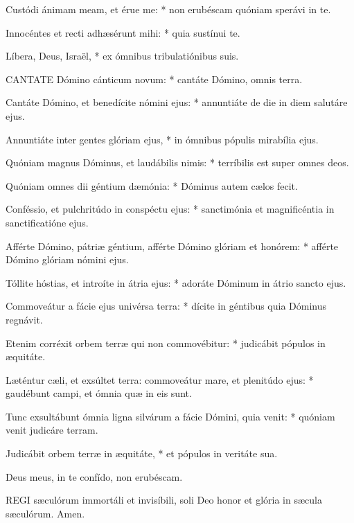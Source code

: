 Custódi ánimam meam, et érue me: * non erubéscam quóniam sperávi in te.

Innocéntes et recti adhæsérunt mihi: * quia sustínui te.

Líbera, Deus, Israël, * ex ómnibus tribulatiónibus suis.



\lettrine[lines=2]{C}{ANTATE} Dómino cánticum novum: * cantáte Dómino, omnis terra.

Cantáte Dómino, et benedícite nómini ejus: * annuntiáte de die in diem salutáre ejus.

Annuntiáte inter gentes glóriam ejus, * in ómnibus pópulis mirabília ejus.

Quóniam magnus Dóminus, et laudábilis nimis: * terríbilis est super omnes deos.

Quóniam omnes dii géntium dæmónia: * Dóminus autem cælos fecit.

Conféssio, et pulchritúdo in conspéctu ejus: * sanctimónia et magnificéntia in sanctificatióne ejus.

Afférte Dómino, pátriæ géntium, afférte Dómino glóriam et honórem: * afférte Dómino glóriam nómini ejus.

Tóllite hóstias, et introíte in átria ejus: * adoráte Dóminum in átrio sancto ejus.

Commoveátur a fácie ejus univérsa terra: * dícite in géntibus quia Dóminus regnávit.

Etenim corréxit orbem terræ qui non commovébitur: * judicábit pópulos in æquitáte.

Læténtur cæli, et exsúltet terra: commoveátur mare, et plenitúdo ejus: * gaudébunt campi, et ómnia quæ in eis sunt.

Tunc exsultábunt ómnia ligna silvárum a fácie Dómini, quia venit: * quóniam venit judicáre terram.

Judicábit orbem terræ in æquitáte, * et pópulos in veritáte sua.


 Deus meus, in te confído, non erubéscam.



\lettrine[lines=2]{R}{EGI} sæculórum immortáli et invisíbili, soli Deo honor et glória in sæcula sæculórum. Amen.

